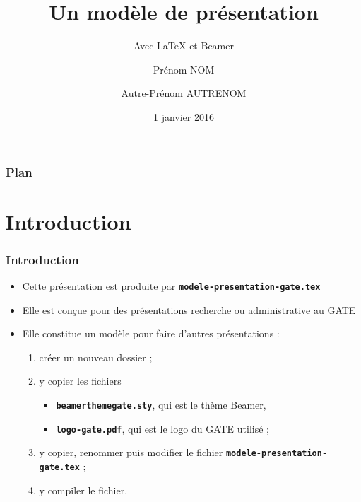 \documentclass[10pt,t]{beamer}
\title{Un modèle de présentation}
\subtitle{Avec \LaTeX{} et Beamer}
\author{Prénom NOM \and Autre-Prénom AUTRENOM}
\institute{Université Lyon~2 \and CNRS}
\date{1\ier{} janvier 2016}
\begin{document}
\maketitle

\begin{frame}
  \frametitle{Plan}
  \tableofcontents %
\end{frame}


\section{Introduction}


\begin{frame}%
  \frametitle{Introduction}


  \begin{itemize}
  \item Cette présentation est produite par \texttt{\textbf{modele-presentation-gate.tex}}
  \item Elle est conçue pour des présentations recherche ou administrative au GATE
  \end{itemize}

  \pause


  \begin{itemize}
  \item Elle constitue un modèle pour faire d'autres présentations :
    
    \begin{enumerate}
    \item créer un nouveau dossier ;
    \item y copier les fichiers 

      \begin{itemize}
      \item \texttt{\textbf{beamerthemegate.sty}}, qui est le thème Beamer,
      \item \texttt{\textbf{logo-gate.pdf}}, qui est le logo du GATE utilisé ;
      \end{itemize}

    \item y copier, renommer puis modifier le fichier \texttt{\textbf{modele-presentation-gate.tex}} ;
    \item y compiler le fichier.
    \end{enumerate}
  \end{itemize}
  
\end{frame}
\end{document}
